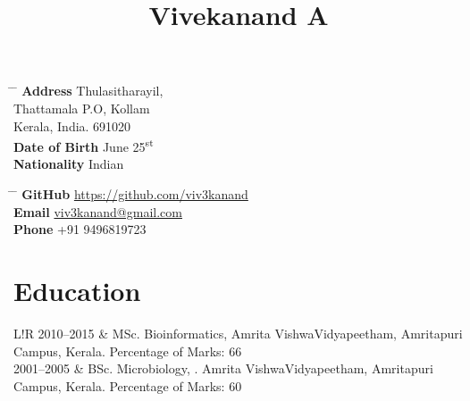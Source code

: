 \documentclass[a4paper, 10pt]{article}
\date{\vspace{-10ex}}
\newcommand\VRule{\color{lightgray}\vrule width 0.5pt}
\begin{document}
\title{\vspace{-12ex}Vivekanand A}

\maketitle

\parbox[t]{0.5\textwidth}{
\begin{tabbing}
\hspace{3cm} \= \hspace{4cm} \= \kill
{\bf Address} \> Thulasitharayil, \\
\>Thattamala P.O, Kollam\\
\> Kerala, India. 691020 \\
{\bf Date of Birth}  June 25\textsuperscript{st} \\
{\bf Nationality} \> Indian \\
\end{tabbing}
}
\hfil
\parbox[t]{0.5\textwidth}{
\begin{tabbing}
\hspace{2cm} \= \hspace{4cm} \= \kill
{\bf GitHub} \> \href{https://github.com/viv3kanand}{https://github.com/viv3kanand} \\
{\bf Email} \> \href{mailto:viv3kanand@gmail.com}{viv3kanand@gmail.com} \\
{\bf Phone} \> +91 9496819723
\end{tabbing}
}



\section*{Education}
\begin{tabular}{L!{\VRule}R}
   2010--2015 & MSc. Bioinformatics, Amrita VishwaVidyapeetham, Amritapuri Campus, Kerala. Percentage of Marks: 66 \\
   2001--2005 & BSc. Microbiology, . Amrita VishwaVidyapeetham, Amritapuri Campus, Kerala. Percentage of Marks: 60 \\
\end{tabular}
\end{document}
